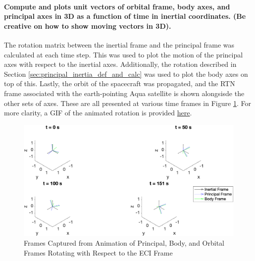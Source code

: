 \paragraph{Compute and plots unit vectors of orbital frame, body axes, and principal axes in 3D as a function of time in inertial coordinates. (Be creative on how to show moving vectors in 3D).}

The rotation matrix between the inertial frame and the principal frame was calculated at each time step. This was used to plot the motion of the principal axes with respect to the inertial axes. Additionally, the rotation described in Section \ref{sec:principal_inertia_def_and_calc} was used to plot the body axes on top of this. Lastly, the orbit of the spacecraft was propagated, and the RTN frame associated with the earth-pointing Aqua satellite is shown alongsisde the other sets of axes. These are all presented at various time frames in Figure \ref{fig:frame_rotation}. For more clarity, a GIF of the animated rotation is provided \href{https://github.com/riordk626/AA279C-AQUA/blob/main/Images/reference_frame_gif_EA.gif}{here}.

\begin{figure}[H]
    \centering
    \captionsetup{justification  = centering}
    \includegraphics[width = 15cm]{Images/reference_frame_motion_EA.png}
    \caption{Frames Captured from Animation of Principal, Body, and Orbital Frames Rotating with Respect to the ECI Frame}
    \label{fig:frame_rotation}
\end{figure}